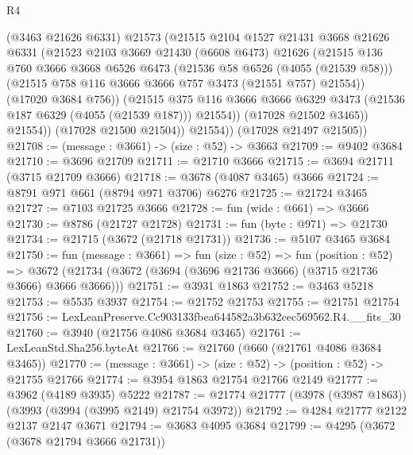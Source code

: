 \begin{lexlean}{R4}
\begin{coremodule}
                  (@3463 @21626 @6331)
                  @21573
                  (@21515
                    @2104
                    @1527
                    @21431
                    @3668
                    @21626
                    @6331
                    (@21523
                      @2103
                      @3669
                      @21430
                      (@6608 @6473)
                      @21626
                      (@21515
                        @136
                        @760
                        @3666
                        @3668
                        @6526
                        @6473
                        (@21536 @58 @6526 (@4055 (@21539 @58)))
                        (@21515 @758 @116 @3666 @3666 @757 @3473 (@21551 @757) @21554))
                      (@17020 @3684 @756))
                    (@21515
                      @375
                      @116
                      @3666
                      @3666
                      @6329
                      @3473
                      (@21536 @187 @6329 (@4055 (@21539 @187)))
                      @21554))
                  (@17028 @21502 @3465))
                @21554))
            (@17028 @21500 @21504))
          @21554))
      (@17028 @21497 @21505))
@21708 := (message : @3661) -> (size : @52) -> @3663
@21709 := @9402 @3684
@21710 := @3696 @21709
@21711 := @21710 @3666
@21715 := @3694 @21711 (@3715 @21709 @3666)
@21718 := @3678 (@4087 @3465) @3666
@21724 := @8791 @971 @661 (@8794 @971 @3706) @6276
@21725 := @21724 @3465
@21727 := @7103 @21725 @3666
@21728 := fun (wide : @661) => @3666
@21730 := @8786 (@21727 @21728)
@21731 := fun (byte : @971) => @21730
@21734 := @21715 (@3672 (@21718 @21731))
@21736 := @5107 @3465 @3684
@21750 := fun (message : @3661) =>
  fun (size : @52) =>
  fun (position : @52) =>
  @3672 (@21734 (@3672 (@3694 (@3696 @21736 @3666) (@3715 @21736 @3666) @3666 @3666)))
@21751 := @3931 @1863
@21752 := @3463 @5218
@21753 := @5535 @3937
@21754 := @21752 @21753
@21755 := @21751 @21754
@21756 := LexLeanPreserve.Cc903133fbea644582a3b632cec569562.R4.__fits_30
@21760 := @3940 (@21756 @4086 @3684 @3465)
@21761 := LexLeanStd.Sha256.byteAt
@21766 := @21760 (@660 (@21761 @4086 @3684 @3465))
@21770 := (message : @3661) -> (size : @52) -> (position : @52) -> @21755 @21766
@21774 := @3954 @1863 @21754 @21766 @2149
@21777 := @3962 (@4189 @3935) @5222
@21787 := @21774 @21777 (@3978 (@3987 @1863)) (@3993 (@3994 (@3995 @2149) @21754 @3972))
@21792 := @4284 @21777 @2122 @2137 @2147 @3671
@21794 := @3683 @4095 @3684
@21799 := @4295 (@3672 (@3678 @21794 @3666 @21731))

\end{coremodule}
\end{lexlean}
